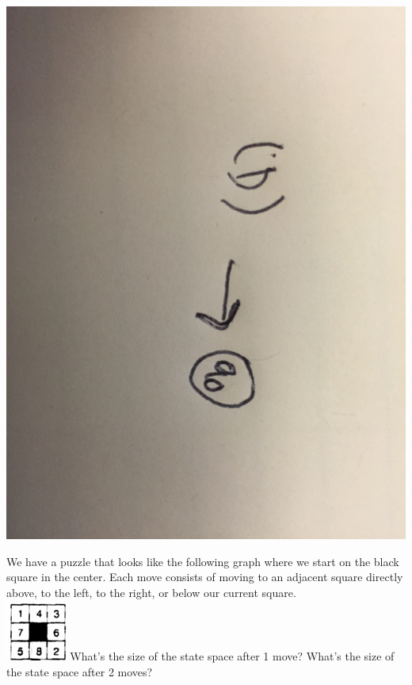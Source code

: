 \documentclass[solution, letterpaper]{cs20inclass}
\begin{document}
\begin{solution}
\includegraphics[width=15cm]{class16p1d}
\end{solution}

\problem We have a puzzle that looks like the following graph where we start on the black square in the center. Each move consists of moving to an adjacent square directly above, to the left, to the right, or below our current square.\\
\includegraphics[width=2cm]{initial}
\subproblem What's the size of the state space after 1 move?
\subproblem What's the size of the state space after 2 moves?
\end{document}
